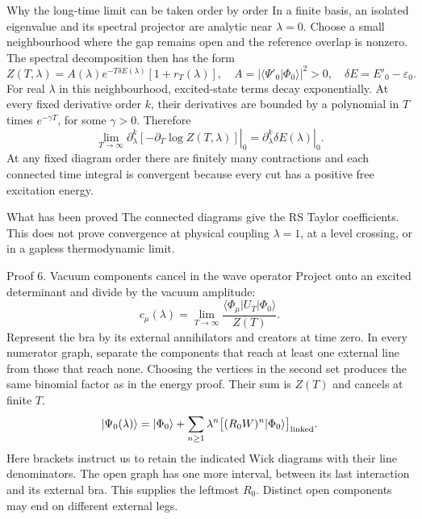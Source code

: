 \documentclass[aspectratio=169,10pt]{beamer}
\newcommand{\ket}[1]{\vert #1\rangle}
\newcommand{\braket}[2]{\langle #1\vert #2\rangle}
\newcommand{\mel}[3]{\langle #1\lvert #2\rvert #3\rangle}
\newcommand{\ph}{\Phi_0}
\begin{document}
\begin{frame}{Why the long-time limit can be taken order by order}
In a finite basis, an isolated eigenvalue and its spectral projector are analytic near $\lambda=0$. Choose a small neighbourhood where the gap remains open and the reference overlap is nonzero. The spectral decomposition then has the form
\[
 Z(T,\lambda)=A(\lambda)e^{-T\delta E(\lambda)}[1+r_T(\lambda)],
 \quad A=|\braket{\Psi'_0}{\ph}|^2>0,
 \quad\delta E=E'_0-\varepsilon_0.
\]
For real $\lambda$ in this neighbourhood, excited-state terms decay exponentially. At every fixed derivative order $k$, their derivatives are bounded by a polynomial in $T$ times $e^{-\gamma T}$, for some $\gamma>0$. Therefore
\[
 \lim_{T\to\infty}\left.\partial_\lambda^k[-\partial_T\log Z(T,\lambda)]\right|_0
 =\left.\partial_\lambda^k\delta E(\lambda)\right|_0.
\]
At any fixed diagram order there are finitely many contractions and each connected time integral is convergent because every cut has a positive free excitation energy.
\begin{block}{What has been proved}
The connected diagrams give the RS Taylor coefficients. This does not prove convergence at physical coupling $\lambda=1$, at a level crossing, or in a gapless thermodynamic limit.
\end{block}
\end{frame}


\begin{frame}{Proof 6. Vacuum components cancel in the wave operator}
Project onto an excited determinant and divide by the vacuum amplitude:
\[
 c_\mu(\lambda)=\lim_{T\to\infty}\frac{\mel{\Phi_\mu}{U_T}{\ph}}{Z(T)}.
\]
Represent the bra by its external annihilators and creators at time zero. In every numerator graph, separate the components that reach at least one external line from those that reach none. Choosing the vertices in the second set produces the same binomial factor as in the energy proof. Their sum is $Z(T)$ and cancels at finite $T$.
\[
 \ket{\Psi_0(\lambda)}=\ket{\ph}
   +\sum_{n\ge1}\lambda^n\big[(R_0 W)^n\ket{\ph}\big]_{\rm linked}.
\]
Here brackets instruct us to retain the indicated Wick diagrams with their line denominators. The open graph has one more interval, between its last interaction and its external bra. This supplies the leftmost $R_0$. Distinct open components may end on different external legs.
\end{frame}
\end{document}
